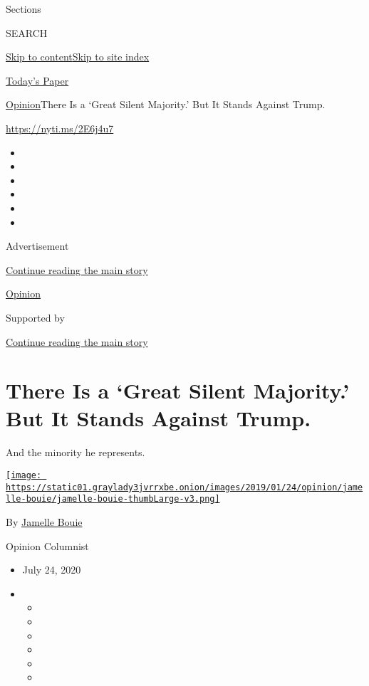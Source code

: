 Sections

SEARCH

\protect\hyperlink{site-content}{Skip to
content}\protect\hyperlink{site-index}{Skip to site index}

\href{https://myaccount.nytimes3xbfgragh.onion/auth/login?response_type=cookie\&client_id=vi}{}

\href{https://www.nytimes3xbfgragh.onion/section/todayspaper}{Today's
Paper}

\href{/section/opinion}{Opinion}\textbar{}There Is a `Great Silent
Majority.' But It Stands Against Trump.

\url{https://nyti.ms/2E6j4u7}

\begin{itemize}
\item
\item
\item
\item
\item
\item
\end{itemize}

Advertisement

\protect\hyperlink{after-top}{Continue reading the main story}

\href{/section/opinion}{Opinion}

Supported by

\protect\hyperlink{after-sponsor}{Continue reading the main story}

\hypertarget{there-is-a-great-silent-majority-but-it-stands-against-trump}{%
\section{There Is a `Great Silent Majority.' But It Stands Against
Trump.}\label{there-is-a-great-silent-majority-but-it-stands-against-trump}}

And the minority he represents.

\href{https://www.nytimes3xbfgragh.onion/column/jamelle-bouie}{\texttt{[image: https://static01.graylady3jvrrxbe.onion/images/2019/01/24/opinion/jamelle-bouie/jamelle-bouie-thumbLarge-v3.png]}}

By
\href{https://www.nytimes3xbfgragh.onion/column/jamelle-bouie}{Jamelle
Bouie}

Opinion Columnist

\begin{itemize}
\item
  July 24, 2020
\item
  \begin{itemize}
  \item
  \item
  \item
  \item
  \item
  \item
  \end{itemize}
\end{itemize}

